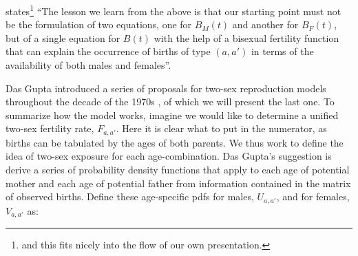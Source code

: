 \FloatBarrier
\citet{gupta1978alternative} states\footnote{and this fits nicely into the flow
of our own presentation.} ``The lesson we learn from the above is that our
starting point must not be the formulation of two equations, one for $B_M(t)$ and another for
$B_F(t)$, but of a single equation for $B(t)$ with the help of a bisexual
fertility function that can explain the occurrence of births of type $(a,a')$ in
terms of the availability of both males and females''.

Das Gupta introduced a series of proposals for two-sex reproduction models
throughout the decade of the 1970s \citep{gupta1972two, gupta1973us,
gupta1976interactive, gupta1978alternative}, of which we will present the last
one. To summarize how the model works, imagine we would like to determine a
unified two-sex fertility rate, $F_{a,a'}$. Here it is clear
what to put in the numerator, as births can be tabulated by the ages of both parents.
 We thus work to define the idea of two-sex exposure for each age-combination. Das Gupta's
suggestion is derive a series of probability density functions that apply to
each age of potential mother and each age of potential father from information
contained in the matrix of observed births. Define these age-specific pdfs for
males, $U_{a,a'}$, and for females, $V_{a,a'}$ as:

